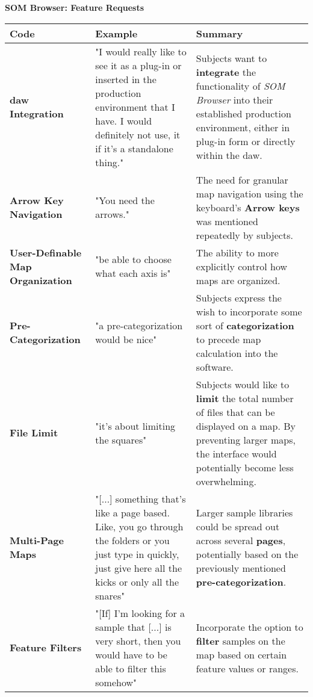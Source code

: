 \begin{table}[!htb]
  \renewcommand{\arraystretch}{1.2}
  \centering
  \textbf{SOM Browser: Feature Requests} \\ [3mm]
  \footnotesize
  \colorbox{light-bg}{
  \begin{tabular}{ p{4.0cm} p{4.75cm} p{4.75cm} }
    \hline
    \textbf{Code} & \textbf{Example} & \textbf{Summary} \\
    \hline
    \textbf{\gls{daw} Integration}
    &
    "I would really like to see it as a plug-in or inserted in the production
    environment that I have. I would definitely not use, it if it's a
    standalone thing."
    &
    Subjects want to \textbf{integrate} the functionality of
    \textit{SOM Browser} into their established production environment, either
    in plug-in form or directly within the \gls{daw}.
    \\
    \textbf{Arrow Key Navigation}
    &
    "You need the arrows."
    &
    The need for granular map navigation using the keyboard's
    \textbf{Arrow keys} was mentioned repeatedly by subjects.
    \\
    \textbf{User-Definable Map Organization}
    &
    "be able to choose what each axis is"
    &
    The ability to more explicitly control how maps are organized.
    \\
    \textbf{Pre-Categorization}
    &
    "a pre-categorization would be nice"
    &
    Subjects express the wish to incorporate some sort of
    \textbf{categorization} to precede map calculation into the software.
    \\
    \textbf{File Limit}
    &
    "it’s about limiting the squares"
    &
    Subjects would like to \textbf{limit} the total number of files that can be
    displayed on a map. By preventing larger maps, the interface would
    potentially become less overwhelming.
    \\
    \textbf{Multi-Page Maps}
    &
    "[...] something that’s like a page based. Like, you go through the folders
    or you just type in quickly, just give here all the kicks or only all the
    snares"
    &
    Larger sample libraries could be spread out across several \textbf{pages},
    potentially based on the previously mentioned \textbf{pre-categorization}.
    \\
    \textbf{Feature Filters}
    &
    "[If] I'm looking for a sample that [...] is very short, then you
    would have to be able to filter this somehow"
    &
    Incorporate the option to \textbf{filter} samples on the map based on
    certain feature values or ranges.

\end{tabular}}
\end{table}
